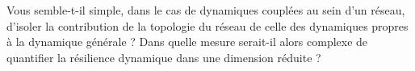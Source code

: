 Vous semble-t-il simple, dans le cas de dynamiques couplées au sein d'un réseau, d'isoler la contribution de la topologie du réseau de celle des dynamiques propres à la dynamique générale ? Dans quelle mesure serait-il alors complexe de quantifier la résilience dynamique dans une dimension réduite ?


















